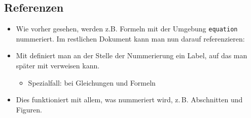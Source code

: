 \subsection{Referenzen}

\begin{frame}{\subsecname}
    \begin{itemize}
        \item Wie vorher gesehen, werden z.B. Formeln mit der Umgebung \texttt{equation} nummeriert.
            Im restlichen Dokument kann man nun darauf \alert{referenzieren}:
        \item Mit  definiert man an der Stelle der Nummerierung ein
            \alert{Label}, auf das man später mit  verweisen kann.
            \begin{itemize}
                \item Spezialfall:  bei Gleichungen und Formeln
            \end{itemize}
        \item Dies funktioniert mit allem, was nummeriert wird, z.\,B. Abschnitten und Figuren.
    \end{itemize}
\end{frame}
